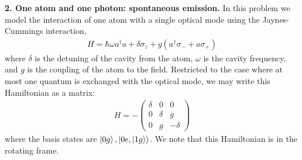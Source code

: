 \documentclass{article}
\theoremstyle{definition}
\begin{document}
\noindent \textbf{2. One atom and one photon: spontaneous emission.} In this problem we model the interaction of one atom with a single optical mode using the Jaynes-Cummings interaction,
\begin{align*}
H = \hbar \omega a^\dagger a + \delta \sigma_z + g(a^\dagger \sigma_- + a\sigma_+)
\end{align*}
where $\delta$ is the detuning of the cavity from the atom, $\omega$ is the cavity frequency, and $g$ is the coupling of the atom to the field. Restricted to the case where at most one quantum is exchanged with the
optical mode, we may write this Hamiltonian as a matrix:
\begin{align*}
H = -\begin{pmatrix}
\delta & 0 & 0 \\ 0 & \delta & g \\ 0 & g & -\delta 
\end{pmatrix}
\end{align*}
where the basis states are $\ket{0g}, \ket{0e, \ket{1g}}$. We note that this Hamiltonian is in the rotating frame. 
\end{document}

